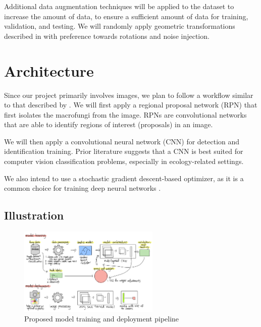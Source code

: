 \documentclass{article} %
\begin{document}
Additional data augmentation techniques will be applied to the dataset to increase the amount of data, to ensure a sufficient amount of data for training, validation, and testing. We will randomly apply geometric transformations described in \cite{ShortenKhoshgoftaar.SurveyImageData.2019} with preference towards rotations and noise injection.

\section{Architecture}
\label{arch}
Since our project primarily involves images, we plan to follow a workflow similar to that described by \cite{S.RenK.HeEtAl.FasterRCNNRealTime.2017}. We will first apply a regional proposal network (RPN) that first isolates the macrofungi from the image. RPNs are convolutional networks that are able to identify regions of interest (proposals) in an image.

We will then apply a convolutional neural network (CNN) for detection and identification training. Prior literature \citep{BarreStoverEtAl.LeafNetComputerVision.2017} suggests that a CNN is best suited for computer vision classification problems, especially in ecology-related settings.

We also intend to use a stochastic gradient descent-based optimizer, as it is a common choice for training deep neural networks \citep{JamesWittenEtAl.IntroductionStatisticalLearning.2023}.

\subsection{Illustration}
\begin{figure}[h]
  \begin{center}
  \includegraphics[width=0.6\textwidth]{figures/model.png}
  \end{center}
  \caption{Proposed model training and deployment pipeline}
\end{figure}
\end{document}
